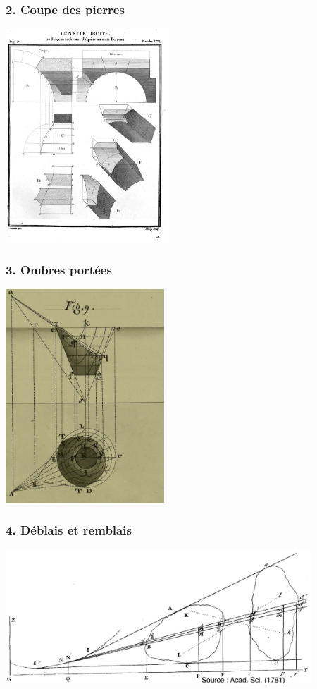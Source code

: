 \documentclass[9pt]{beamer}
\begin{document}
\begin{frame}
\frametitle{\bf 2. Coupe des pierres}
 
\centering \includegraphics[height=8.0cm]{pierres}

\end{frame}

\begin{frame}
\frametitle{\bf 3. Ombres port\'ees}
 
\centering \includegraphics[height=8.0cm]{ombres}

\end{frame}

\begin{frame}
\frametitle{\bf 4. D\'eblais et remblais}
 
\centering \includegraphics[height=5.0cm]{deblais}

\end{frame}
\end{document}
